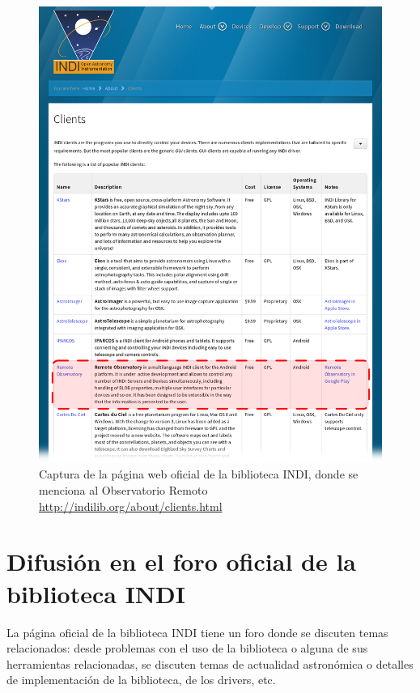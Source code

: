 \begin{figure}
 \centering
 \includegraphics[width=12cm]{../images/indilibWeb3.png}
 \caption[Captura de la página web oficial de la biblioteca INDI, donde se menciona al Observatorio Remoto]{Captura de la página web oficial de la biblioteca INDI, donde se menciona al Observatorio Remoto \protect\href{http://indilib.org/about/clients.html}{http://indilib.org/about/clients.html}}
 \label{fig:indiLibWeb}
\end{figure}



\section{Difusión en el foro oficial de la biblioteca INDI}

La página oficial de la biblioteca INDI tiene un foro donde se discuten temas relacionados: desde problemas con el uso de la biblioteca o alguna de sus herramientas relacionadas, se discuten temas de actualidad astronómica o detalles de implementación de la biblioteca, de los drivers, etc.

